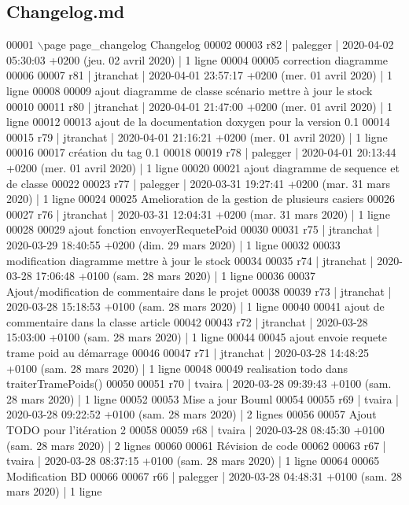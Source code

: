 \hypertarget{_changelog_8md_source}{}\subsection{Changelog.\+md}

\begin{DoxyCode}
00001 \(\backslash\)page page\_changelog Changelog
00002 
00003 r82 | palegger | 2020-04-02 05:30:03 +0200 (jeu. 02 avril 2020) | 1 ligne
00004 
00005 correction diagramme
00006 
00007 r81 | jtranchat | 2020-04-01 23:57:17 +0200 (mer. 01 avril 2020) | 1 ligne
00008 
00009 ajout diagramme de classe scénario mettre à jour le stock
00010 
00011 r80 | jtranchat | 2020-04-01 21:47:00 +0200 (mer. 01 avril 2020) | 1 ligne
00012 
00013 ajout de la documentation doxygen pour la version 0.1
00014 
00015 r79 | jtranchat | 2020-04-01 21:16:21 +0200 (mer. 01 avril 2020) | 1 ligne
00016 
00017 création du tag 0.1
00018 
00019 r78 | palegger | 2020-04-01 20:13:44 +0200 (mer. 01 avril 2020) | 1 ligne
00020 
00021 ajout diagramme de sequence et de classe
00022 
00023 r77 | palegger | 2020-03-31 19:27:41 +0200 (mar. 31 mars 2020) | 1 ligne
00024 
00025 Amelioration de la gestion de plusieurs casiers
00026 
00027 r76 | jtranchat | 2020-03-31 12:04:31 +0200 (mar. 31 mars 2020) | 1 ligne
00028 
00029 ajout fonction envoyerRequetePoid
00030 
00031 r75 | jtranchat | 2020-03-29 18:40:55 +0200 (dim. 29 mars 2020) | 1 ligne
00032 
00033 modification diagramme mettre à jour le stock
00034 
00035 r74 | jtranchat | 2020-03-28 17:06:48 +0100 (sam. 28 mars 2020) | 1 ligne
00036 
00037 Ajout/modification de commentaire dans le projet
00038 
00039 r73 | jtranchat | 2020-03-28 15:18:53 +0100 (sam. 28 mars 2020) | 1 ligne
00040 
00041 ajout de commentaire dans la classe article
00042 
00043 r72 | jtranchat | 2020-03-28 15:03:00 +0100 (sam. 28 mars 2020) | 1 ligne
00044 
00045 ajout envoie requete trame poid au démarrage
00046 
00047 r71 | jtranchat | 2020-03-28 14:48:25 +0100 (sam. 28 mars 2020) | 1 ligne
00048 
00049 realisation todo dans traiterTramePoids()
00050 
00051 r70 | tvaira | 2020-03-28 09:39:43 +0100 (sam. 28 mars 2020) | 1 ligne
00052 
00053 Mise a jour Bouml
00054 
00055 r69 | tvaira | 2020-03-28 09:22:52 +0100 (sam. 28 mars 2020) | 2 lignes
00056 
00057 Ajout TODO pour l'itération 2
00058 
00059 r68 | tvaira | 2020-03-28 08:45:30 +0100 (sam. 28 mars 2020) | 2 lignes
00060 
00061 Révision de code
00062 
00063 r67 | tvaira | 2020-03-28 08:37:15 +0100 (sam. 28 mars 2020) | 1 ligne
00064 
00065 Modification BD
00066 
00067 r66 | palegger | 2020-03-28 04:48:31 +0100 (sam. 28 mars 2020) | 1 ligne

\end{DoxyCode}
